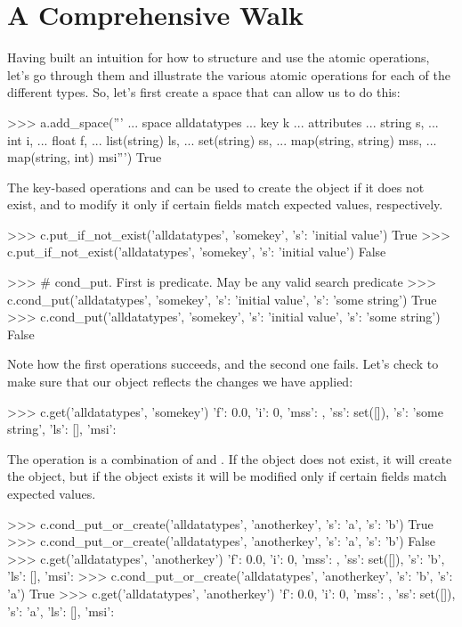 \section{A Comprehensive Walk}
\label{sec:atomic-ops:walk}

Having built an intuition for how to structure and use the atomic operations,
let's go through them and illustrate the various atomic operations for each of
the different types. So, let's first create a space that can allow us to do
this:

\begin{pythoncode}
>>> a.add_space('''
... space alldatatypes
... key k
... attributes
...    string s,
...    int i,
...    float f,
...    list(string) ls,
...    set(string) ss,
...    map(string, string) mss,
...    map(string, int) msi''')
True
\end{pythoncode}

The key-based operations  and  can be
used to create the object if it does not exist, and to modify it only if certain
fields match expected values, respectively.

\begin{pythoncode}
>>> c.put_if_not_exist('alldatatypes', 'somekey', {'s': 'initial value'})
True
>>> c.put_if_not_exist('alldatatypes', 'somekey', {'s': 'initial value'})
False

>>> # cond_put.  First is predicate.  May be any valid search predicate
>>> c.cond_put('alldatatypes', 'somekey', {'s': 'initial value'}, {'s': 'some string'})
True
>>> c.cond_put('alldatatypes', 'somekey', {'s': 'initial value'}, {'s': 'some string'})
False
\end{pythoncode}

Note how the first operations succeeds, and the second one fails. Let's check to
make sure that our object reflects the changes we have applied:

\begin{pythoncode}
>>> c.get('alldatatypes', 'somekey')
{'f': 0.0, 'i': 0, 'mss': {}, 'ss': set([]), 's': 'some string', 'ls': [], 'msi': {}}
\end{pythoncode}

The operation  is a combination of  and .  If the object does not exist, it will create the object, but if the object exists it will be modified only if certain fields match expected values.

\begin{pythoncode}
>>> c.cond_put_or_create('alldatatypes', 'anotherkey', {'s': 'a'}, {'s': 'b'})
True
>>> c.cond_put_or_create('alldatatypes', 'anotherkey', {'s': 'a'}, {'s': 'b'})
False
>>> c.get('alldatatypes', 'anotherkey')
{'f': 0.0, 'i': 0, 'mss': {}, 'ss': set([]), 's': 'b', 'ls': [], 'msi': {}}
>>> c.cond_put_or_create('alldatatypes', 'anotherkey', {'s': 'b'}, {'s': 'a'})
True
>>> c.get('alldatatypes', 'anotherkey')
{'f': 0.0, 'i': 0, 'mss': {}, 'ss': set([]), 's': 'a', 'ls': [], 'msi': {}}
\end{pythoncode}

